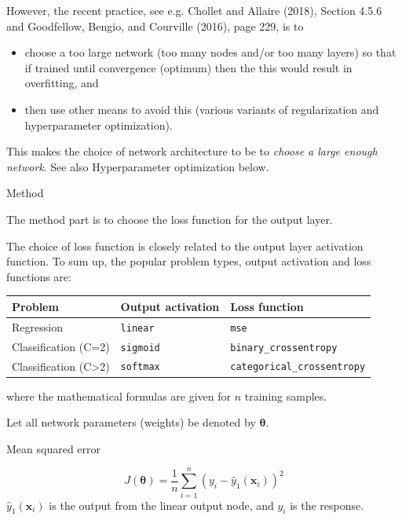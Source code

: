 \documentclass[10pt,ignorenonframetext,]{beamer}
\providecommand{\tightlist}{%
  \setlength{\itemsep}{0pt}\setlength{\parskip}{0pt}}
\begin{document}
\begin{frame}

However, the recent practice, see e.g. Chollet and Allaire (2018),
Section 4.5.6 and Goodfellow, Bengio, and Courville (2016), page 229, is
to

\begin{itemize}
\tightlist
\item
  choose a too large network (too many nodes and/or too many layers) so
  that if trained until convergence (optimum) then the this would result
  in overfitting, and
\item
  then use other means to avoid this (various variants of regularization
  and hyperparameter optimization).
\end{itemize}

This makes the choice of network architecture to be to \emph{choose a
large enough network}. See also Hyperparameter optimization below.

\end{frame}

\begin{frame}[fragile]

\begin{block}{Method}

The method part is to choose the loss function for the output layer.

The choice of loss function is closely related to the output layer
activation function. To sum up, the popular problem types, output
activation and loss functions are:

\begin{longtable}[]{@{}lll@{}}
\toprule
Problem & Output activation & Loss function\tabularnewline
\midrule
\endhead
Regression & \texttt{linear} & \texttt{mse}\tabularnewline
Classification (C=2) & \texttt{sigmoid} &
\texttt{binary\_crossentropy}\tabularnewline
Classification (C\textgreater{}2) & \texttt{softmax} &
\texttt{categorical\_crossentropy}\tabularnewline
\bottomrule
\end{longtable}

where the mathematical formulas are given for \(n\) training samples.

\end{block}

\end{frame}

\begin{frame}

Let all network parameters (weights) be denoted by
\({\boldsymbol \theta}\).

\begin{block}{Mean squared error}

\[ J({\boldsymbol \theta})=\frac{1}{n}\sum_{i=1}^n (y_i-{\hat{y}_1({\boldsymbol x}_i)})^2\]
\(\hat{y}_1({\boldsymbol x}_i)\) is the output from the linear output
node, and \(y_i\) is the response.

\end{block}

\end{frame}
\end{document}
